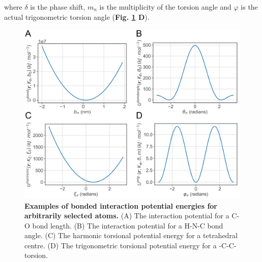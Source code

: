 %
%
where $\delta$ is the phase shift, $m_n$ is the multiplicity of the torsion angle and $\varphi$ is the actual trigonometric torsion angle (\textbf{Fig. \ref{fig:aa_nms} D}). 
%
%
%
%
%
\begin{figure}[!ht]
\includegraphics[scale=0.65]{bonded_potential_energy.png}
\caption[Examples of bonded interaction potential energies for arbitrarily selected atom pairs.] {\textbf{Examples of bonded interaction potential energies for arbitrarily selected atoms.} (A) The interaction potential for a C-O bond length. (B) The interaction potential for a H-N-C bond angle. (C) The harmonic torsional potential energy for a tetrahedral centre. (D) The trigonometric torsional potential energy for a -C-C- torsion.}
\label{fig:aa_nms}
\end{figure}
%
%
\clearpage

